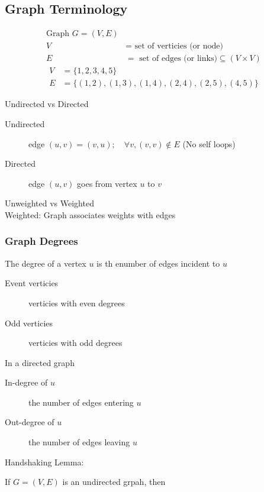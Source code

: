 \documentclass{article}
\begin{document}
\subsection*{Graph Terminology}
\begin{align*}
    \text{Graph } G = (V, E)                                     \\
    V & = \text{ set of verticies (or node)}                     \\
    E & = \text{ set of edges (or links)} \subseteq (V \times V)
\end{align*}
\begin{align*}
    V & = \{1, 2, 3, 4, 5\}                                  \\
    E & = \{(1, 2), (1, 3), (1, 4), (2, 4), (2, 5), (4, 5)\}
\end{align*}

Undirected vs Directed
\begin{description}
    \item[Undirected]  edge \((u, v) = (v, u); \quad \forall v, (v, v) \notin E\)  (No self loops)
    \item[Directed] edge \((u, v)\) goes from vertex \(u\) to \(v\)
\end{description}

Unweighted vs Weighted \\
Weighted: Graph associates weights with edges

\subsubsection*{Graph Degrees}
The degree of a vertex \(u\) is th enumber of edges incident to \(u\)
\begin{description}
    \item[Event verticies]  verticies with even degrees
    \item[Odd verticies] verticies with odd degrees
\end{description}

In a directed graph
\begin{description}
    \item[In-degree of \(u\)]  the number of edges entering \(u\)
    \item[Out-degree of \(u\)] the number of edges leaving \(u\)
\end{description}

Handshaking Lemma:

If \(G = (V, E)\) is an undirected grpah, then
\end{document}
